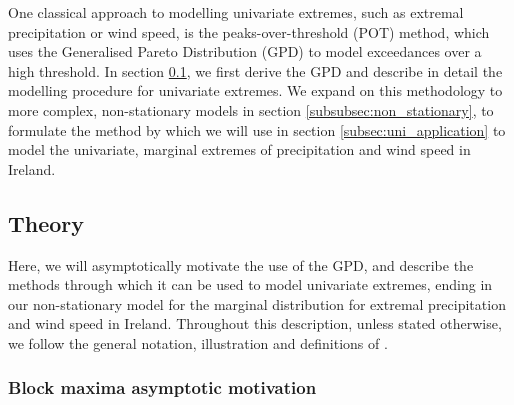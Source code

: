 \documentclass{article}
\numberwithin{equation}{section}
\begin{document}
One classical approach to modelling univariate extremes, such as extremal precipitation or wind speed, is the peaks-over-threshold (POT) method, which uses the Generalised Pareto Distribution (GPD) to model exceedances over a high threshold.
In section \ref{subsec:uni_theory}, we first derive the GPD and describe in detail the modelling procedure for univariate extremes.
We expand on this methodology to more complex, non-stationary models in section \ref{subsubsec:non_stationary}, to formulate the method by which we will use in section \ref{subsec:uni_application} to model the univariate, marginal extremes of precipitation and wind speed in Ireland.

\subsection{Theory} \label{subsec:uni_theory}

Here, we will asymptotically motivate the use of the GPD, and describe the methods through which it can be used to model univariate extremes, ending in our non-stationary model for the marginal distribution for extremal precipitation and wind speed in Ireland.
Throughout this description, unless stated otherwise, we follow the general notation, illustration and definitions of \cite{Coles2001}.

\subsubsection{Block maxima asymptotic motivation} \label{subsubsec:asymptotic}

\end{document}
